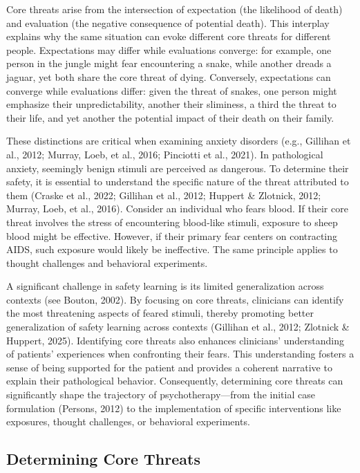 \documentclass[
  man,floatsintext]{apa7}
\begin{document}
Core threats arise from the intersection of expectation (the likelihood of death) and evaluation (the negative consequence of potential death).
This interplay explains why the same situation can evoke different core threats for different people.
Expectations may differ while evaluations converge: for example, one person in the jungle might fear encountering a snake, while another dreads a jaguar, yet both share the core threat of dying.
Conversely, expectations can converge while evaluations differ: given the threat of snakes, one person might emphasize their unpredictability, another their sliminess, a third the threat to their life, and yet another the potential impact of their death on their family.

These distinctions are critical when examining anxiety disorders (e.g., Gillihan et al., 2012; Murray, Loeb, et al., 2016; Pinciotti et al., 2021).
In pathological anxiety, seemingly benign stimuli are perceived as dangerous.
To determine their safety, it is essential to understand the specific nature of the threat attributed to them (Craske et al., 2022; Gillihan et al., 2012; Huppert \& Zlotnick, 2012; Murray, Loeb, et al., 2016).
Consider an individual who fears blood.
If their core threat involves the stress of encountering blood-like stimuli, exposure to sheep blood might be effective.
However, if their primary fear centers on contracting AIDS, such exposure would likely be ineffective.
The same principle applies to thought challenges and behavioral experiments.

A significant challenge in safety learning is its limited generalization across contexts (see Bouton, 2002).
By focusing on core threats, clinicians can identify the most threatening aspects of feared stimuli, thereby promoting better generalization of safety learning across contexts (Gillihan et al., 2012; Zlotnick \& Huppert, 2025).
Identifying core threats also enhances clinicians' understanding of patients' experiences when confronting their fears.
This understanding fosters a sense of being supported for the patient and provides a coherent narrative to explain their pathological behavior.
Consequently, determining core threats can significantly shape the trajectory of psychotherapy---from the initial case formulation (Persons, 2012) to the implementation of specific interventions like exposures, thought challenges, or behavioral experiments.

\subsection{Determining Core Threats}\label{determining-core-threats}
\end{document}
